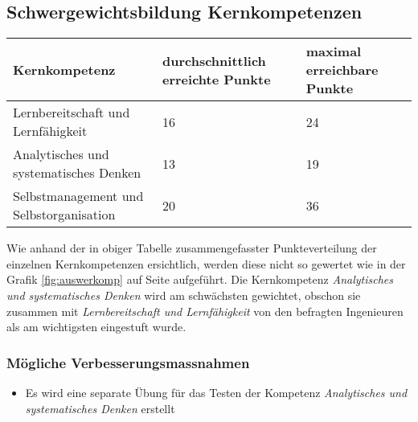 \subsection{Schwergewichtsbildung Kernkompetenzen}
\begin{center}
  \begin{tabular}{ | p{7cm} | p{3cm} | p{3cm} |}
   \hline
   \textbf{Kernkompetenz} & \textbf{durchschnittlich erreichte Punkte} & \textbf{maximal erreichbare Punkte} \\ \hline
   Lernbereitschaft und Lernfähigkeit & 16 & 24\\ \hline
   Analytisches und systematisches Denken & 13 & 19\\ \hline
   Selbstmanagement und Selbstorganisation & 20 & 36\\ \hline
  \end{tabular}
\end{center}
Wie anhand der in obiger Tabelle zusammengefasster Punkteverteilung der einzelnen Kernkompetenzen ersichtlich, werden diese nicht so gewertet wie in der Grafik \ref{fig:auswerkomp} auf Seite \pageref{fig:auswerkomp} aufgeführt. Die Kernkompetenz \textit{Analytisches und systematisches Denken} wird am schwächsten gewichtet, obschon sie zusammen mit \textit{Lernbereitschaft und Lernfähigkeit} von den befragten Ingenieuren als am wichtigsten eingestuft wurde.
\subsubsection{Mögliche Verbesserungsmassnahmen}
\begin{itemize}
\item Es wird eine separate Übung für das Testen der Kompetenz \textit{Analytisches und systematisches Denken} erstellt
\end{itemize}
